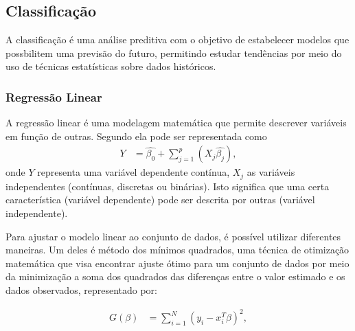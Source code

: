 \subsection{Classificação}

A classificação é uma análise preditiva com o objetivo de estabelecer modelos que possbilitem uma previsão do futuro, permitindo estudar tendências por meio do uso de técnicas estatísticas sobre dados históricos.

\subsubsection{Regressão Linear}


A regressão linear é uma modelagem matemática \footnotemark {} que permite descrever variáveis em função de outras. Segundo  ela pode ser representada como
\begin{equation}
  \label{eq:regressao_linear}
  \begin{aligned}
Y &= \hat{\beta_{0}} + \sum_{j=1}^{p} (X_{j}\hat{\beta_{j}}), 
  \end{aligned}  
\end{equation}
onde \begin{math}Y\end{math} representa uma variável dependente contínua, \begin{math}X_{j}\end{math} as variáveis independentes (contínuas, discretas ou binárias). Isto significa que uma certa característica (variável dependente) pode ser descrita por outras (variável independente).

Para ajustar o modelo linear ao conjunto de dados, é possível utilizar diferentes maneiras. Um deles é método dos mínimos quadrados, uma técnica de otimização matemática que visa encontrar ajuste ótimo para um conjunto de dados por meio da minimização a soma dos quadrados das diferenças entre o valor estimado e os dados observados, representado por:

\begin{equation}
  \label{eq:minimos_quadrados}
  \begin{aligned}
G(\beta) &= \sum_{i=1}^{N} (y_{i}-x_{i}^{T}\beta)^{2}, 
  \end{aligned}  
\end{equation}

